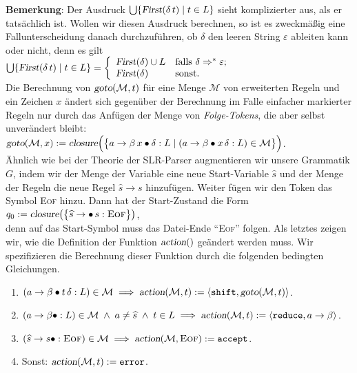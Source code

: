 \noindent
\textbf{Bemerkung}: Der Ausdruck $\bigcup\{\textsl{First}(\delta\,t)\mid{}t\in{}L\}$
sieht komplizierter aus, als er tats\"achlich ist.  Wollen wir diesen Ausdruck berechnen, so
ist es zweckm\"a{\ss}ig eine Fallunterscheidung danach durchzuf\"uhren, ob $\delta$ den leeren
String $\varepsilon$ ableiten kann oder nicht, denn es gilt
\\[0.2cm]
\hspace*{1.3cm}
$\bigcup\{\textsl{First}(\delta\,t)\mid{}t\in{}L\} = 
\left\{
\begin{array}{ll}
  \textsl{First}(\delta) \cup L  & \mbox{falls $\delta \Rightarrow^* \varepsilon$;}  \\
  \textsl{First}(\delta)         & \mbox{sonst.}  
\end{array}
\right.
$
\\[0.2cm]
Die Berechnung von $\textsl{goto}(\mathcal{M},t)$ f\"ur eine Menge $\mathcal{M}$ von erweiterten Regeln und
ein Zeichen $x$ \"andert sich gegen\"uber der Berechnung im Falle einfacher markierter Regeln
nur durch das Anf\"ugen der Menge von \emph{Folge-Tokens}, die aber selbst unver\"andert bleibt:
\\[0.2cm]
\hspace*{1.3cm}
$\textsl{goto}(\mathcal{M}, x) := \textsl{closure}\Bigl( \bigl\{ 
   a \rightarrow \beta\, x \bullet \delta:L \mid (a \rightarrow \beta \bullet x\, \delta:L) \in \mathcal{M} 
   \bigr\} \Bigr)$. 
\\[0.2cm]
\"Ahnlich wie bei der Theorie der SLR-Parser augmentieren wir unsere Grammatik $G$, indem wir
der Menge der Variable eine neue Start-Variable $\widehat{s}$ und der Menge der Regeln die
neue Regel $\widehat{s} \rightarrow s$ hinzuf\"ugen.  Weiter f\"ugen wir den Token das Symbol
\textsc{Eof} hinzu.  Dann hat der Start-Zustand die  Form
\\[0.2cm]
\hspace*{1.3cm}
$q_0 := \textsl{closure}\bigr(\bigl\{ \widehat{s} \rightarrow \bullet\, s:\textsc{Eof}\bigr\}\bigr)$,
\\[0.2cm]
denn auf das Start-Symbol muss das Datei-Ende ``\textsc{Eof}'' folgen.
Als letztes zeigen wir, wie die Definition der Funktion $\textsl{action}()$ ge\"andert werden muss.
Wir spezifizieren die Berechnung dieser Funktion durch die folgenden bedingten Gleichungen.
\begin{enumerate}
\item $(a \rightarrow \beta \bullet t\, \delta:L) \in \mathcal{M} \;\Longrightarrow\;
       \textsl{action}(\mathcal{M},t) := \langle \texttt{shift}, \textsl{goto}(\mathcal{M},t) \rangle$. 
\item $(a \rightarrow \beta \bullet:L) \in \mathcal{M} \;\wedge\; a \not= \widehat{s}
       \;\wedge\; t \in L \;\Longrightarrow\;
       \textsl{action}(\mathcal{M},t) := \langle \texttt{reduce}, a \rightarrow \beta \rangle$. 
\item $(\widehat{s} \rightarrow s \bullet:\textsc{Eof}) \in \mathcal{M} \;\Longrightarrow\;
       \textsl{action}(\mathcal{M},\textsc{Eof}) := \texttt{accept}$. 
\item Sonst: \quad $\textsl{action}(\mathcal{M},t) := \texttt{error}$. 
\end{enumerate}
